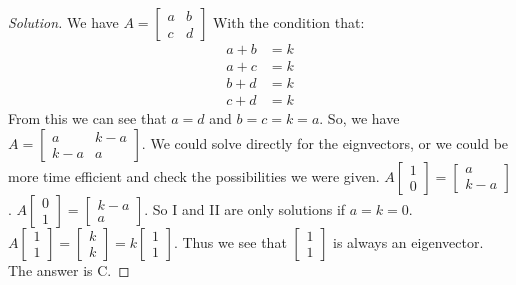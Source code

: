 \documentclass[oneside]{book}
\theoremstyle{mystyle}
\begin{document}
\begin{proof}[Solution]
We have $A = \begin{bmatrix} a & b \\ c & d\end{bmatrix}$ With the condition that:
\begin{align}
    \nonumber a+b &= k \\
    \nonumber a+c &= k \\
    \nonumber b+d &= k \\
    \nonumber c+d &= k
\end{align}
From this we can see that $a = d$ and $b=c = k=a$.
So, we have $A = \begin{bmatrix} a & k-a \\ k-a & a\end{bmatrix}$. We could solve directly for the eignvectors, or we could be more time efficient and check the possibilities we were given. $A\begin{bmatrix}1 \\ 0 \end{bmatrix} = \begin{bmatrix} a \\ k-a \end{bmatrix}$. $A\begin{bmatrix} 0 \\ 1 \end{bmatrix} = \begin{bmatrix} k-a \\ a \end{bmatrix}$. So I and II are only solutions if $a = k = 0$. $A\begin{bmatrix} 1 \\ 1 \end{bmatrix} = \begin{bmatrix} k \\ k\end{bmatrix} = k \begin{bmatrix} 1 \\ 1 \end{bmatrix}$. Thus we see that $\begin{bmatrix} 1 \\ 1 \end{bmatrix}$ is always an eigenvector. The answer is C.
\end{proof}
\end{document}
